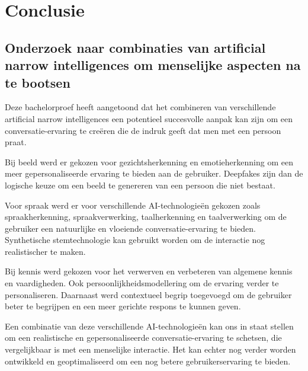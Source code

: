 
\chapter{Conclusie}
\label{ch:conclusie}


\section{Onderzoek naar combinaties van artificial narrow intelligences om menselijke aspecten na te bootsen}

Deze bachelorproef heeft aangetoond dat het combineren van verschillende artificial narrow intelligences een potentieel succesvolle aanpak kan zijn om een conversatie-ervaring te creëren die de indruk geeft dat men met een persoon praat.

Bij beeld werd er gekozen voor gezichtsherkenning en emotieherkenning om een meer gepersonaliseerde ervaring te bieden aan de gebruiker. Deepfakes zijn dan de logische keuze om een beeld te genereren van een persoon die niet bestaat.

Voor spraak werd er voor verschillende AI-technologieën gekozen zoals spraakherkenning, spraakverwerking, taalherkenning en taalverwerking om de gebruiker een natuurlijke en vloeiende conversatie-ervaring te bieden. Synthetische stemtechnologie kan gebruikt worden om de interactie nog realistischer te maken.

Bij kennis werd gekozen voor het verwerven en verbeteren van algemene kennis en vaardigheden. Ook persoonlijkheidsmodellering om de ervaring verder te personaliseren. Daarnaast werd contextueel begrip toegevoegd om de gebruiker beter te begrijpen en een meer gerichte respons te kunnen geven.

Een combinatie van deze verschillende AI-technologieën kan ons in staat stellen om een realistische en gepersonaliseerde conversatie-ervaring te schetsen, die vergelijkbaar is met een menselijke interactie. Het kan echter nog verder worden ontwikkeld en geoptimaliseerd om een nog betere gebruikerservaring te bieden.


